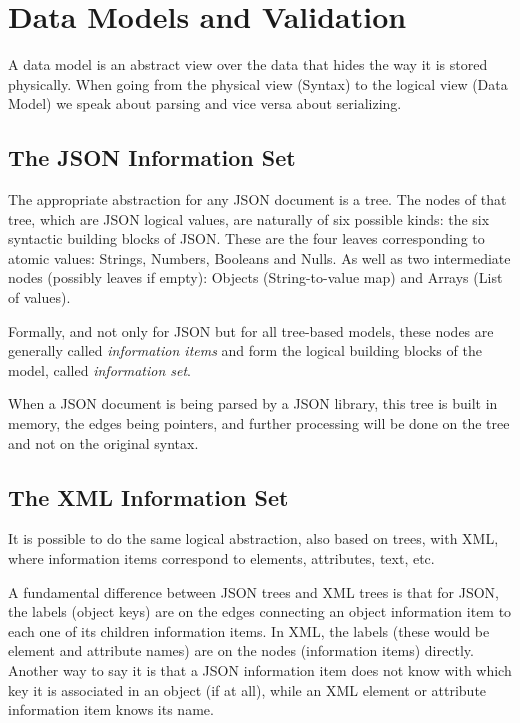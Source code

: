 \section{Data Models and Validation}

A data model is an abstract view over the data that hides the way it is stored physically. When going from the physical view (Syntax) to the logical view (Data Model) we speak about parsing and vice versa about serializing.

\subsection{The JSON Information Set}

The appropriate abstraction for any JSON document is a tree. The nodes of that tree, which are JSON logical values, are naturally of six possible kinds: the six syntactic building blocks of JSON. These are the four leaves corresponding to atomic values: Strings, Numbers, Booleans and Nulls. As well as two intermediate nodes (possibly leaves if empty): Objects (String-to-value map) and Arrays (List of values).

Formally, and not only for JSON but for all tree-based models, these nodes are generally called \textit{information items} and form the logical building blocks of the model, called \textit{information set}.

When a JSON document is being parsed by a JSON library, this tree is built in memory, the edges being pointers, and further processing will be done on the tree and not on the original syntax.

\subsection{The XML Information Set}

It is possible to do the same logical abstraction, also based on trees, with XML, where information items correspond to elements, attributes, text, etc.

A fundamental difference between JSON trees and XML trees is that for JSON, the labels (object keys) are on the edges connecting an object information item to each one of its children information items. In XML, the labels (these would be element and attribute names) are on the nodes (information items) directly. Another way to say it is that a JSON information item does not know with which key it is associated in an object (if at all), while an XML element or attribute information item knows its name.

